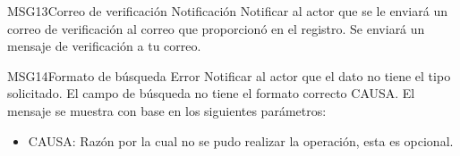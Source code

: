 \begin{Message}{MSG13}{Correo de verificación} 
	\MSGitem[Tipo: ] Notificación
	\MSGitem[Objetivo: ] Notificar al actor que se le enviará un correo de verificación al correo que proporcionó en el registro.
	\MSGitem[Redacción: ] Se enviará un mensaje de verificación a tu correo.
\end{Message}

\begin{Message}{MSG14}{Formato de búsqueda}
	\MSGitem[Tipo: ] Error
	\MSGitem[Objetivo: ] Notificar al actor que el dato no tiene el tipo solicitado.
	\MSGitem[Redacción: ] El campo de búsqueda no tiene el formato correcto CAUSA.
	\MSGitem[Parámetros: ] El mensaje se muestra con base en los siguientes parámetros:
		\begin{itemize}	
			\item CAUSA: Razón por la cual no se pudo realizar la operación, esta es opcional.
		\end{itemize}
\end{Message}